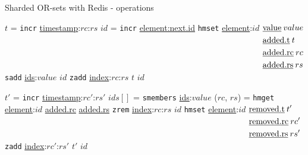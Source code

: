 \begin{algorithm}[h!]
  \small
  \caption{Sharded OR-sets with Redis - operations}
  \begin{algorithmic}[0]
      \State $t$ = \texttt{incr} \underline{timestamp}:$rc$:$rs$
      \State $id$ = \texttt{incr} \underline{element:next.id}
      \State \texttt{hmset} \underline{element}:$id$ $\begin{aligned}[t]
                                                       & \text{\underline{value}}\:value \\
                                                       & \text{\underline{added.t}}\:t \\
                                                       & \text{\underline{added.rc}}\:rc \\
                                                       & \text{\underline{added.rs}}\:rs
                                                      \end{aligned}$
      \State \texttt{sadd} \underline{ids}:$value$ $id$
      \State \texttt{zadd} \underline{index}:$rc$:$rs$ $t$ $id$
    \EndProcedure
    
      \State $t'$ = \texttt{incr} \underline{timestamp}:$rc'$:$rs'$
      \State $ids[]$ = \texttt{smembers} \underline{ids}:$value$
        \State ($rc$, $rs$) = \texttt{hmget} \underline{element}:$id$ \underline{added.rc} \underline{added.rs}
        \State \texttt{zrem} \underline{index}:$rc$:$rs$ $id$
        \State \texttt{hmset} \underline{element}:$id$ $\begin{aligned}[t]
                                                       & \text{\underline{removed.t}}\:t' \\
                                                       & \text{\underline{removed.rc}}\:rc' \\
                                                       & \text{\underline{removed.rs}}\:rs'
                                                      \end{aligned}$
        \State \texttt{zadd} \underline{index}:$rc'$:$rs'$ $t'$ $id$
      \EndFor
    \EndProcedure
    

\end{algorithmic}
\end{algorithm}
